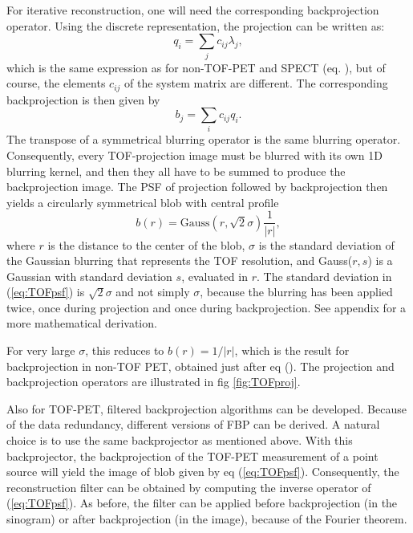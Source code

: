 For iterative reconstruction, one will need the corresponding
backprojection operator. Using the discrete representation, the
projection can be written as:
\begin{equation}
  q_i = \sum_j c_{ij} \lambda_j,
\end{equation}
which is the same expression as for non-TOF-PET and SPECT
(eq. ), but of course, the elements $c_{ij}$ of the
system matrix are different. The corresponding backprojection is then
given by
\begin{equation}
  b_j = \sum_i c_{ij} q_i.
\end{equation}
The transpose of a symmetrical blurring operator is the same blurring
operator. Consequently, every TOF-projection image must be blurred
with its own 1D blurring kernel, and then they all have to be summed
to produce the backprojection image. The PSF of projection followed by
backprojection then yields a circularly symmetrical blob with central
profile
\begin{equation}
  b(r) = \mbox{Gauss}(r,\sqrt{2}\sigma) \frac{1}{|r|}, \label{eq:TOFpsf}
\end{equation}
where $r$ is the distance to the center of the blob, $\sigma$ is the
standard deviation of the Gaussian blurring that represents the TOF
resolution, and Gauss($r,s$) is a Gaussian with standard deviation
$s$, evaluated in $r$. The standard deviation in (\ref{eq:TOFpsf}) is
$\sqrt{2}\sigma$ and not simply $\sigma$, because the blurring has
been applied twice, once during projection and once during
backprojection. See appendix  for a more
mathematical derivation.

For very large $\sigma$, this reduces to $b(r) = 1 / |r|$, which is
the result for backprojection in non-TOF PET, obtained just after eq
(). The projection and backprojection operators
are illustrated in fig \ref{fig:TOFproj}.

Also for TOF-PET, filtered backprojection algorithms can be
developed. Because of the data redundancy, different versions of FBP
can be derived. A natural choice is to use the same backprojector as
mentioned above. With this backprojector, the backprojection of the
TOF-PET measurement of a point source will yield the image of blob
given by eq (\ref{eq:TOFpsf}). Consequently, the reconstruction filter
can be obtained by computing the inverse operator of
(\ref{eq:TOFpsf}). As before, the filter can be applied before
backprojection (in the sinogram) or after backprojection (in the
image), because of the Fourier theorem.

